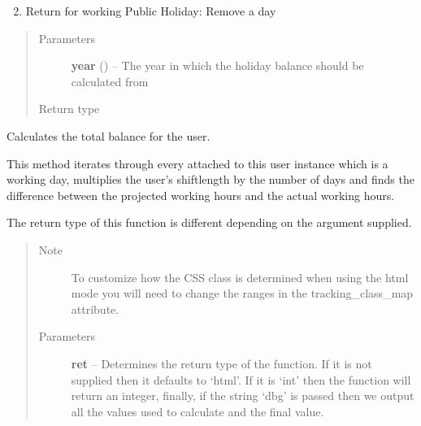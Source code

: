 \documentclass[letterpaper,10pt,english]{sphinxmanual}
\begin{document}
\begin{fulllineitems}
\begin{fulllineitems}
\begin{enumerate}
\end{enumerate}
\begin{enumerate}
\setcounter{enumi}{1}
\item {} 
Return for working Public Holiday: Remove a day

\end{enumerate}
\begin{quote}\begin{description}
\item[{Parameters}] \leavevmode
\textbf{year} () -- The year in which the holiday balance should be
calculated from

\item[{Return type}] \leavevmode
{}

\end{description}\end{quote}

\end{fulllineitems}


\begin{fulllineitems}
\label{timetracker:timetracker.tracker.models.Tbluser.get_total_balance}
Calculates the total balance for the user.

This method iterates through every {\hyperref[timetracker:timetracker.tracker.models.TrackingEntry]{}} attached to
this user instance which is a working day, multiplies the user's
shiftlength by the number of days and finds the difference between the
projected working hours and the actual working hours.

The return type of this function is different depending on the
argument supplied.
\begin{quote}\begin{description}
\item[{Note }] \leavevmode
To customize how the CSS class is determined when using the
html mode you will need to change the ranges in the
tracking\_class\_map attribute.

\item[{Parameters}] \leavevmode
\textbf{ret} -- Determines the return type of the function. If it is not
supplied then it defaults to `html'. If it is `int' then
the function will return an integer, finally, if the
string `dbg' is passed then we output all the values used
to calculate and the final value.


\end{description}
\end{quote}
\end{fulllineitems}
\end{fulllineitems}
\end{document}
